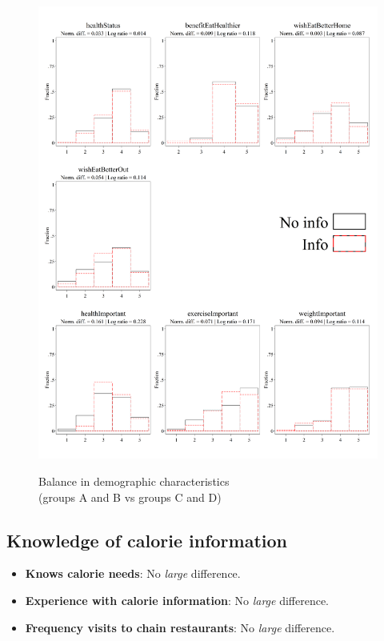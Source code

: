 \documentclass[12pt]{article}
\begin{document}
\begin{figure}[ht]
  \caption{Balance in demographic characteristics \\ (groups A and B vs groups C and D)}\label{fig:group1_health}
  \begin{center}
  {\includegraphics[width=1\textwidth]{./figures/covDifExp_health.png}}
  \end{center}
\end{figure}

\FloatBarrier

\clearpage

\subsection{Knowledge of calorie information}

\begin{itemize}
  \item \textbf{Knows calorie needs}: No \emph{large} difference.

  \item \textbf{Experience with calorie information}: No \emph{large} difference.

  \item \textbf{Frequency visits to chain restaurants}: No \emph{large} difference.
\end{itemize}
\end{document}

